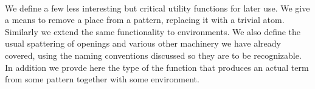 \begin{code}
\\[\AgdaEmptyExtraSkip]%
%
\\[\AgdaEmptyExtraSkip]%
\>[0]\AgdaSpace{}%
\AgdaSymbol{:}\AgdaSpace{}%
\AgdaSpace{}%
\AgdaSpace{}%
\AgdaSpace{}%
\AgdaSpace{}%
\AgdaSymbol{(}\AgdaSpace{}%
\AgdaSpace{}%
\AgdaSymbol{)}\AgdaSpace{}%
\AgdaSpace{}%
\AgdaSpace{}%
\AgdaSpace{}%
\AgdaSymbol{(}\AgdaSpace{}%
\AgdaOperator{\AgdaPrimitive{+}}\AgdaSpace{}%
\AgdaSymbol{)}\<%
\\
\>[0]%
\>[8]\AgdaSpace{}%
\AgdaSpace{}%
%
\>[19]\AgdaSymbol{=}\AgdaSpace{}%
\<%
\\
\>[0]\AgdaSymbol{(}\AgdaSpace{}%
\AgdaSymbol{)}%
\>[8]\AgdaSpace{}%
\AgdaSymbol{(}\AgdaSpace{}%
\AgdaSpace{}%
\AgdaSymbol{)}%
\>[19]\AgdaSymbol{=}\AgdaSpace{}%
\AgdaSpace{}%
\AgdaSpace{}%
\<%
\\
\>[0]\AgdaSymbol{(}\AgdaSpace{}%
\AgdaSymbol{)}%
\>[8]\AgdaSpace{}%
\AgdaSymbol{(}\AgdaSpace{}%
\AgdaSpace{}%
\AgdaSymbol{)}%
\>[19]\AgdaSymbol{=}\AgdaSpace{}%
\AgdaSpace{}%
\AgdaSpace{}%
\<%
\\
\>[0]\AgdaSpace{}%
%
\>[8]\AgdaSpace{}%
\AgdaSpace{}%
%
\>[19]\AgdaSymbol{=}\AgdaSpace{}%
\AgdaSpace{}%
\AgdaSpace{}%
\<%
\end{code}

We define a few less interesting but critical utility functions for later
use. We give a means to remove a place from a pattern, replacing it with
a trivial atom. Similarly we extend the same functionality to environments.
We  also define the usual spattering of openings and various other machinery
we have already covered, using the naming conventions discussed so they are
to be recognizable. In addition we provde here the type of the function that
produces an actual term from some pattern together with some environment.

